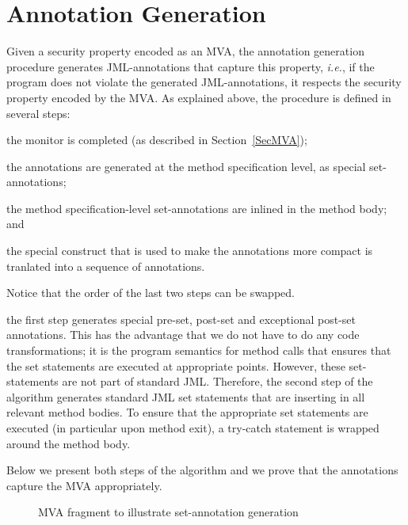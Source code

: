 \section{Annotation Generation}\label{SecAnnotGen} 

Given a security property encoded as an MVA, the annotation generation
procedure generates JML-annotations that capture this property,
\emph{i.e.}, if the program does not violate the generated
JML-annotations, it respects the security property encoded by the
MVA. As explained above, the procedure is defined in several steps:
\begin{inparaenum}
\item the monitor is completed (as described in Section~\ref{SecMVA});
\item the annotations are generated at the method specification level,
as special set-annotations;
\item the method specification-level set-annotations are inlined in
the method body; and
\item the special \CaseJML construct that is used to make the
annotations more compact is tranlated into a sequence of \Set
annotations.
\end{inparaenum} 
Notice that the order of the last two steps can be swapped.

the first step generates
special pre-set, post-set and exceptional post-set annotations. This
has the advantage that we do not have to do any code transformations;
it is the program semantics for method calls that ensures that the set
statements are executed at appropriate points. However, these
set-statements are not part of standard JML. Therefore, the second
step of the algorithm generates standard JML set statements that are
inserting in all relevant method bodies. To ensure that the
appropriate set statements are executed (in particular upon method
exit), a try-catch statement is wrapped around the method body. 

Below we present both steps of the algorithm and we prove that the
annotations capture the MVA appropriately.

\begin{figure}
\begin{center}
\end{center}
\caption{MVA fragment to illustrate set-annotation
generation}\label{FigAnnotGenExample}

\end{figure}
